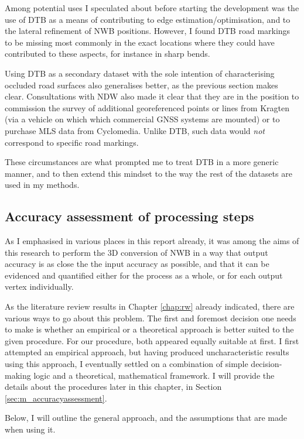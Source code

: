 Among potential uses I speculated about before starting the development was the use of DTB as a means of contributing to edge estimation/optimisation, and to the lateral refinement of NWB positions. However, I found DTB road markings to be missing most commonly in the exact locations where they could have contributed to these aspects, for instance in sharp bends.

Using DTB as a secondary dataset with the sole intention of characterising occluded road surfaces also generalises better, as the previous section makes clear. Consultations with NDW also made it clear that they are in the position to commission the survey of additional georeferenced points or lines from Kragten (via a vehicle on which which commercial GNSS systems are mounted) or to purchase MLS data from Cyclomedia. Unlike DTB, such data would \textit{not} correspond to specific road markings.

These circumstances are what prompted me to treat DTB in a more generic manner, and to then extend this mindset to the way the rest of the datasets are used in my methods.

\subsection{Accuracy assessment of processing steps}
\label{sub:accuracyoverview}

As I emphasised in various places in this report already, it was among the aims of this research to perform the 3D conversion of NWB in a way that output accuracy is as close the the input accuracy as possible, and that it can be evidenced and quantified either for the process as a whole, or for each output vertex individually.

As the literature review results in Chapter \ref{chap:rw} already indicated, there are various ways to go about this problem. The first and foremost decision one needs to make is whether an empirical or a theoretical approach is better suited to the given procedure. For our procedure, both appeared equally suitable at first. I first attempted an empirical approach, but having produced uncharacteristic results using this approach, I eventually settled on a combination of simple decision-making logic and a theoretical, mathematical framework. I will provide the details about the procedures later in this chapter, in Section \ref{sec:m_accuracyassessment}.

Below, I will outline the general approach, and the assumptions that are made when using it.

